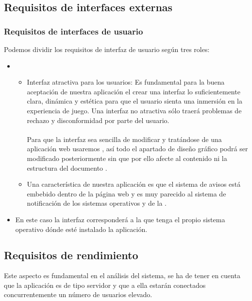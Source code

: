 \subsection{Requisitos de interfaces externas}
\subsubsection{Requisitos de interfaces de usuario}
Podemos dividir los requisitos de interfaz de usuario según tres roles:

\begin{itemize}
  \item {}
    \begin{itemize}
      \item Interfaz atractiva para los usuarios: Es fundamental para
        la buena aceptación de nuestra aplicación el crear una
        interfaz lo suficientemente clara, dinámica y estética para
        que el usuario sienta una inmersión en la experiencia de
        juego. Una interfaz no atractiva sólo traerá problemas de
        rechazo y disconformidad por parte del usuario.\\\\
        Para que la interfaz sea sencilla de modificar y tratándose de
        una aplicación web usaremos , así
        todo el apartado de diseño gráfico podrá ser modificado
        posteriormente sin que por ello afecte al contenido ni la
        estructura del documento .
      \item Una característica de nuestra aplicación es que el sistema
        de avisos está embebido dentro de la página web y es muy
        parecido al sistema de notificación de los sistemas operativos
         y de la  .
    \end{itemize}
  \item {}
    En este caso la interfaz corresponderá a la que tenga el propio
    sistema operativo dónde esté instalado la aplicación.
\end{itemize}

\subsection{Requisitos de rendimiento}
Este aspecto es fundamental en el análisis del sistema, se ha de tener
en cuenta que la aplicación es de tipo servidor y que a ella estarán
conectados concurrentemente un número de usuarios elevado.\\

